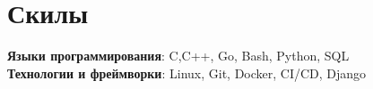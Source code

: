 \documentclass[letterpaper,12pt]{article}
\makeatletter
\newcommand{\resumeItem}[1]{
  \item\small{
    {#1 \vspace{-2pt}}
  }
}
\newcommand{\resumeSubheading}[4]{
  \vspace{-2pt}\item
    \begin{tabular*}{1.0\textwidth}[t]{l@{\extracolsep{\fill}}r}
      \textbf{#1} & \textbf{\small #2} \\
      \textit{\small#3} & \textit{\small #4} \\
    \end{tabular*}\vspace{-5pt}
}
\newcommand{\resumeSubHeadingListStart}{\begin{itemize}[leftmargin=0.0in, label={}]}
\newcommand{\resumeSubHeadingListEnd}{\end{itemize}}
\newcommand{\resumeItemListStart}{\begin{itemize}}
\newcommand{\resumeItemListEnd}{\end{itemize}\vspace{-5pt}}
\makeatother
\begin{document}
%
\section{Скилы}
 \begin{itemize}[leftmargin=0.15in, label={}]
    \small{\item{
     \textbf{Языки программирования}{: C,C++, Go, Bash, Python,   SQL} \\
     \textbf{Технологии и фреймворки}{: Linux, Git, Docker, CI/CD, Django} \\
    }}
 \end{itemize}

 
 \vspace{-16pt}


        
\end{document}
